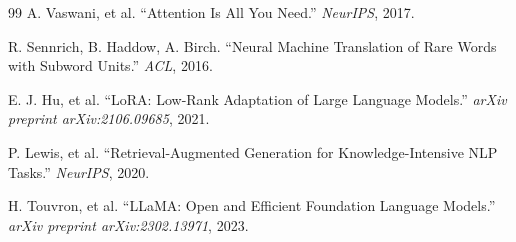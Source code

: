 \documentclass[11pt]{article}
\begin{document}
\begin{thebibliography}{99}
 A. Vaswani, et al. ``Attention Is All You
Need.'' \emph{NeurIPS}, 2017.

 R. Sennrich, B. Haddow, A. Birch. ``Neural
Machine Translation of Rare Words with Subword Units.'' \emph{ACL}, 2016.

 E. J. Hu, et al. ``LoRA: Low-Rank Adaptation of Large
Language Models.'' \emph{arXiv preprint arXiv:2106.09685}, 2021.

 P. Lewis, et al. ``Retrieval-Augmented Generation
for Knowledge-Intensive NLP Tasks.'' \emph{NeurIPS}, 2020.

 H. Touvron, et al. ``LLaMA: Open and Efficient
Foundation Language Models.'' \emph{arXiv preprint arXiv:2302.13971}, 2023.

\end{thebibliography}
\end{document}
